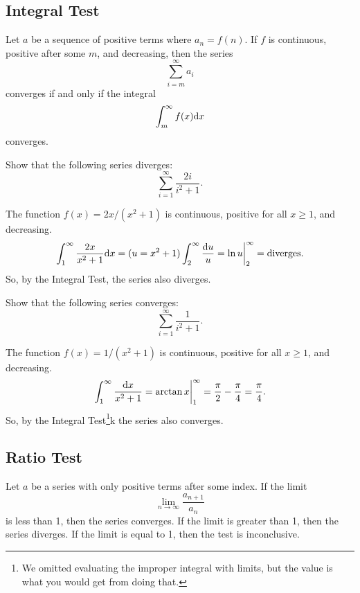 \subsection{Integral Test}
\begin{lemma}
	Let $a$ be a sequence of positive terms where $a_n = f(n)$.
	If $f$ is continuous, positive after some $m$, and decreasing, then the series
	\begin{equation*}
		\sum_{i=m}^{\infty}{a_i}
	\end{equation*}
	converges if and only if the integral
	\begin{equation*}
		\int_{m}^{\infty}{f(x)\mathrm{d} x}
	\end{equation*}
	converges.
\end{lemma}

\begin{example}
	Show that the following series diverges:
	\begin{equation*}
		\sum_{i=1}^{\infty}{\frac{2i}{i^2+1}}.
	\end{equation*}
\end{example}
The function $f(x)=2x/(x^2+1)$ is continuous, positive for all $x \geq 1$, and decreasing.
\begin{equation*}
	\int_{1}^{\infty}{\frac{2x}{x^2+1}\mathrm{d} x} = (u = x^2+1) \int_{2}^{\infty}{\frac{\mathrm{d} u}{u}} = \ln{u}\biggr\rvert_{2}^{\infty} = \text{diverges}.
\end{equation*}
\indent
So, by the Integral Test, the series also diverges.

\begin{example}
	Show that the following series converges:
	\begin{equation*}
		\sum_{i=1}^{\infty}{\frac{1}{i^2+1}}.
	\end{equation*}
\end{example}
The function $f(x)=1/(x^2+1)$ is continuous, positive for all $x \geq 1$, and decreasing.
\begin{equation*}
	\int_{1}^{\infty}{\frac{\mathrm{d} x}{x^2+1}} = \arctan{x}\biggr\rvert_{1}^{\infty} = \frac{\pi}{2} - \frac{\pi}{4} = \frac{\pi}{4}.
\end{equation*}
\indent
So, by the Integral Test\footnote{We omitted evaluating the improper integral with limits, but the value is what you would get from doing that.}k the series also converges.

\subsection{Ratio Test}
\begin{lemma}
	Let $a$ be a series with only positive terms after some index.
	If the limit
	\begin{equation*}
		\lim_{n\to\infty}{\frac{a_{n+1}}{a_n}}
	\end{equation*}
	is less than 1, then the series converges.
	If the limit is greater than 1, then the series diverges.
	If the limit is equal to 1, then the test is inconclusive.
\end{lemma}

